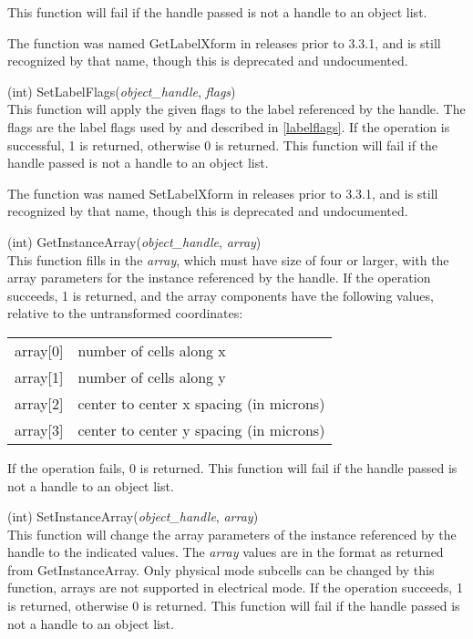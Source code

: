 \begin{description}
This function will fail if the handle passed is not a handle to an
object list.

The function was named {\vt GetLabelXform} in releases prior to 3.3.1,
and is still recognized by that name, though this is deprecated and
undocumented.

\item{(int) \vt SetLabelFlags({\it object\_handle\/}, {\it flags\/})}\\
This function will apply the given flags to the label referenced by
the handle.  The flags are the label flags used by {\Xic} and
described in \ref{labelflags}.  If the operation is successful, 1 is
returned, otherwise 0 is returned.  This function will fail if the
handle passed is not a handle to an object list.

The function was named {\vt SetLabelXform} in releases prior to 3.3.1,
and is still recognized by that name, though this is deprecated and
undocumented.

\item{(int) \vt GetInstanceArray({\it object\_handle\/}, {\it array\/})}\\
This function fills in the {\it array}, which must have size of four
or larger, with the array parameters for the instance referenced by
the handle.  If the operation succeeds, 1 is returned, and the array
components have the following values, relative to the untransformed
coordinates:

\begin{tabular}{ll}
array[0] & number of cells along x\\
array[1] & number of cells along y\\
array[2] & center to center x spacing (in microns)\\
array[3] & center to center y spacing (in microns)\\
\end{tabular}

If the operation fails, 0 is returned.  This function will fail if the
handle passed is not a handle to an object list.

\item{(int) \vt SetInstanceArray({\it object\_handle\/}, {\it array\/})}\\
This function will change the array parameters of the instance
referenced by the handle to the indicated values.  The {\it array}
values are in the format as returned from {\vt GetInstanceArray}. 
Only physical mode subcells can be changed by this function, arrays
are not supported in electrical mode.  If the operation succeeds, 1 is
returned, otherwise 0 is returned.  This function will fail if the
handle passed is not a handle to an object list.


\end{description}
